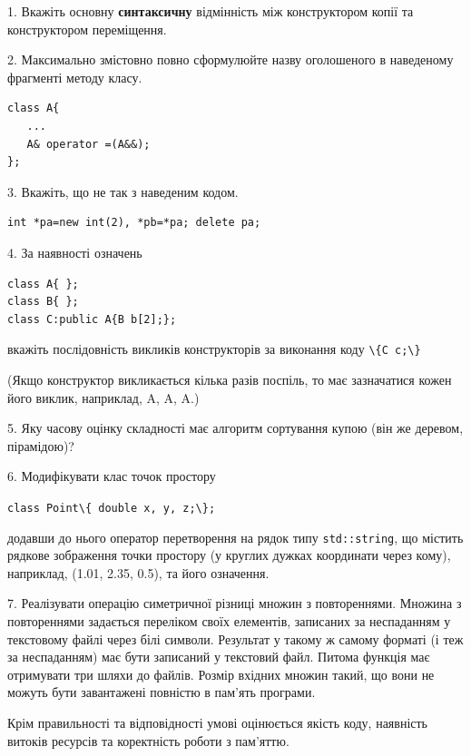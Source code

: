 \documentclass[12pt, ukrainian]{article}
\def\code#1{\Verb!#1!}
\begin{document}
{%
1. Вкажіть основну \textbf{синтаксичну} відмінність між конструктором копії та конструктором переміщення.%
\par
\vspace{2mm}
2. Максимально змістовно повно сформулюйте назву оголошеного в наведеному фрагменті методу класу.
\vspace{-3mm}
\begin{verbatim}class A{
   ...
   A& operator =(A&&);
};\end{verbatim}
\vspace{-3mm}
\par
\vspace{2mm}
3. Вкажіть, що не так з наведеним кодом.
\vspace{-3mm}
\begin{verbatim}int *pa=new int(2), *pb=*pa; delete pa;\end{verbatim}
\vspace{-3mm}
\par
\vspace{2mm}
4. За наявності означень
\vspace{-3mm}
\begin{verbatim}
class A{ };
class B{ };
class C:public A{B b[2];};\end{verbatim}
\vspace{-3mm}
вкажіть послідовність викликів конструкторів за виконання коду \code{\{C c;\}} 

(Якщо конструктор викликається кілька разів поспіль, то має зазначатися кожен його виклик, наприклад, A, A, A.)

\vspace{2mm}
5. Яку часову оцінку складності має алгоритм сортування купою (він же деревом, пірамідою)?
\par
\vspace{2mm}
6. Модифікувати клас точок простору 

\qquad\code{class Point\{ double x, y, z;\};}


додавши до нього оператор перетворення на рядок типу \code{std::string}, що містить рядкове зображення точки простору (у круглих дужках координати через кому), наприклад, (1.01, 2.35, 0.5), та його означення.%
\par
\vspace{2mm}
7. 
Реалізувати операцію симетричної різниці множин з повтореннями. Множина з повтореннями задається переліком своїх елементів, записаних за неспаданням у текстовому файлі через білі символи. Результат у такому ж самому форматі (і теж за неспаданням) має бути записаний у текстовий файл. Питома функція має отримувати три шляхи до файлів. Розмір вхідних множин такий, що вони не можуть бути завантажені повністю в пам’ять програми.

Крім правильності та відповідності умові оцінюється якість коду, наявність витоків ресурсів та коректність роботи з пам'яттю. 

}
\end{document}
